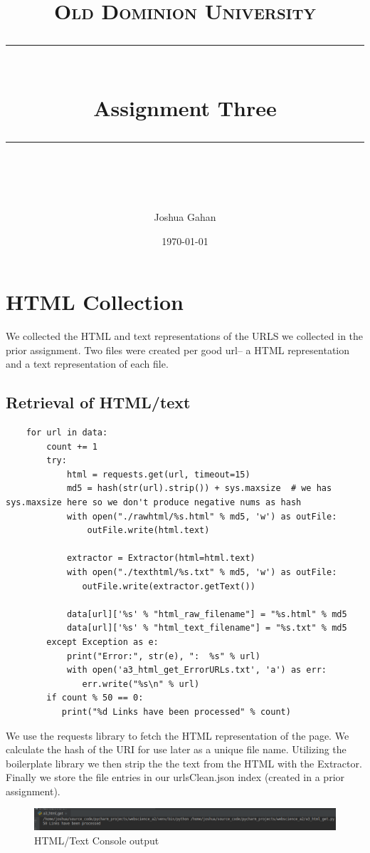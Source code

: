 \documentclass[11pt]{article}
\title{	
	\normalfont\normalsize
	\textsc{Old Dominion University}\\ %
	\vspace{25pt} %
	\rule{\linewidth}{0.5pt}\\ %
	\vspace{20pt} %
	{\huge Assignment Three}\\ %
	\vspace{12pt} %
	\rule{\linewidth}{2pt}\\ %
	\vspace{20pt} %
}
\author{\LARGE Joshua Gahan} %
\date{\normalsize\today} %
\begin{document}
	\maketitle %
	\newpage
	
	\section{HTML Collection}
	\hspace{10mm} We collected the HTML and text representations of the URLS we collected in the prior assignment. Two files were created per good url-- a HTML representation and a text representation of each file. 
	\subsection{Retrieval of HTML/text}
	\begin{lstlisting}
	for url in data:
	    count += 1
	    try:
	        html = requests.get(url, timeout=15)
	        md5 = hash(str(url).strip()) + sys.maxsize  # we has sys.maxsize here so we don't produce negative nums as hash
        	with open("./rawhtml/%s.html" % md5, 'w') as outFile:
	            outFile.write(html.text)
	
	        extractor = Extractor(html=html.text)
	        with open("./texthtml/%s.txt" % md5, 'w') as outFile:
	           outFile.write(extractor.getText())
	
	        data[url]['%s' % "html_raw_filename"] = "%s.html" % md5
	        data[url]['%s' % "html_text_filename"] = "%s.txt" % md5
	    except Exception as e:
	        print("Error:", str(e), ":  %s" % url)
	        with open('a3_html_get_ErrorURLs.txt', 'a') as err:
	           err.write("%s\n" % url)
	    if count % 50 == 0:
	       print("%d Links have been processed" % count)
	\end{lstlisting}
	\hspace{10mm} We use the requests library to fetch the HTML representation of the page. We calculate the hash of the URI for use later as a unique file name. Utilizing the boilerplate library we then strip the the text from the HTML with the Extractor. Finally we store the file entries in our urlsClean.json index (created in a prior assignment). 
	\begin{figure}[h!]
		\includegraphics[scale=0.5]{resources/a3_html_get_run.png}
		\caption{HTML/Text Console output}
	\end{figure}
\end{document}
